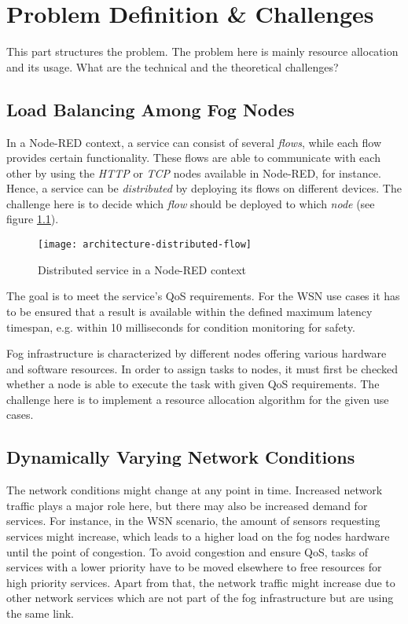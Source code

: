 \chapter{Problem Definition \& Challenges\label{cha:problem-definition}}
This part structures the problem. The problem here is mainly resource allocation and its usage. What are the technical and the theoretical challenges?

\section{Load Balancing Among Fog Nodes}
In a Node-RED context, a service can consist of several \textit{flows}, while each flow provides certain functionality.
These flows are able to communicate with each other by using the \textit{HTTP} or \textit{TCP} nodes available in Node-RED, for instance.
Hence, a service can be \textit{distributed} by deploying its flows on different devices.
The challenge here is to decide which \textit{flow} should be deployed to which \textit{node} (see figure \ref{fig:distributed-flow}).

\begin{figure}[htp]
    \centering
    \texttt{[image: architecture-distributed-flow]}
    \caption{Distributed service in a Node-RED context}
    \label{fig:distributed-flow}
\end{figure}

The goal is to meet the service's QoS requirements.
For the WSN use cases it has to be ensured that a result is available within the defined maximum latency timespan, e.g. within 10 milliseconds for condition monitoring for safety.

Fog infrastructure is characterized by different nodes offering various hardware and software resources.
In order to assign tasks to nodes, it must first be checked whether a node is able to execute the task with given QoS requirements.
The challenge here is to implement a resource allocation algorithm for the given use cases.


\section{Dynamically Varying Network Conditions}
The network conditions might change at any point in time.
Increased network traffic plays a major role here, but there may also be increased demand for services.
For instance, in the WSN scenario, the amount of sensors requesting services might increase, which leads to a higher load on the fog nodes hardware until the point of congestion.
To avoid congestion and ensure QoS, tasks of services with a lower priority have to be moved elsewhere to free resources for high priority services.
Apart from that, the network traffic might increase due to other network services which are not part of the fog infrastructure but are using the same link.\\

